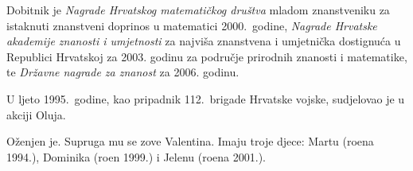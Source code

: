 \documentclass[11pt]{report}
\begin{document}
\medskip

Dobitnik je {\it Nagrade Hrvatskog matemati\v{c}kog dru\v{s}tva} mladom
znanstveniku za istaknuti znanstveni doprinos u matematici
2000.~godine, {\it Nagrade Hrvatske akademije znanosti i umjetnosti}
za najvi\v{s}a znanstvena i umjetni\v{c}ka dostignu\'{c}a u Republici Hrvatskoj za 2003.
godinu za podru\v{c}je prirodnih znanosti i matematike, te {\it Dr\v{z}avne nagrade za znanost}
za 2006. godinu.

\medskip

U ljeto 1995.~godine, kao pripadnik 112.~brigade Hrvatske vojske,
sudjelovao je u akciji Oluja.

\medskip

O\v{z}enjen je. Supruga mu se zove Valentina. Imaju troje djece:
Martu (ro{\dj}ena 1994.), Dominika (ro{\dj}en 1999.) i Jelenu
(ro{\dj}ena 2001.).
\end{document}

